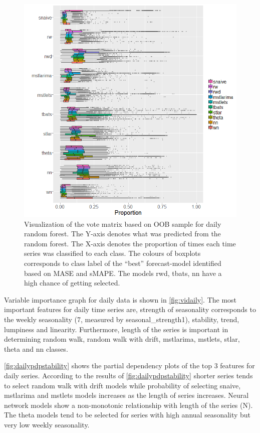 \documentclass[11pt,a4paper,]{article}
\begin{document}
\begin{figure}
\centering
\includegraphics{figures/oobdaily-1.png}
\caption{\label{fig:oobdaily}Visualization of the vote matrix based on OOB
sample for daily random forest. The Y-axis denotes what was predicted
from the random forest. The X-axis denotes the proportion of times each
time series was classified to each class. The colours of boxplots
corresponds to class label of the ``best'' forecast-model identified
based on MASE and sMAPE. The models rwd, tbats, nn have a high chance of
getting selected.}
\end{figure}

Variable importance graph for daily data is shown in
\autoref{fig:vidaily}. The most important features for daily time series
are, strength of seasonality corresponds to the weekly seasonality (7,
measured by seasonal\_strength1), stability, trend, lumpiness and
linearity. Furthermore, length of the series is important in determining
random walk, random walk with drift, mstlarima, mstlets, stlar, theta
and nn classes.

\autoref{fig:dailypdpstability} shows the partial dependency plots of
the top 3 features for daily series. According to the results of
\autoref{fig:dailypdpstability} shorter series tends to select random
walk with drift models while probability of selecting snaive, mstlarima
and mstlets models increases as the length of series increases. Neural
network models show a non-monotonic relationship with length of the
series (N). The theta models tend to be selected for series with high
annual seasonality but very low weekly seasonality.
\end{document}
